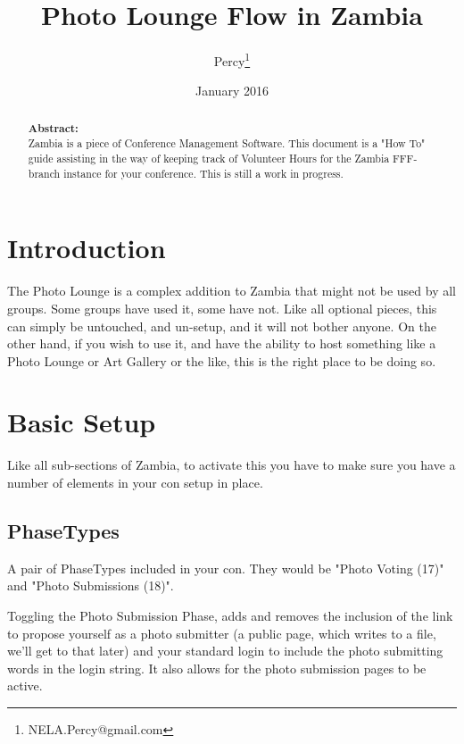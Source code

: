 \documentclass[captions=tablesignature]{scrartcl}
\author{Percy\thanks{NELA.Percy@gmail.com}}
\date{January 2016}
\title{Photo Lounge Flow in Zambia}
\begin{document}
\maketitle
{}
\thispagestyle{fancy}
\renewcommand{\headrulewidth}{0pt}
\renewcommand{\footrulewidth}{0pt}
\lhead{}
\rhead{}
\chead{}
\lfoot{}
\cfoot{}
\rfoot{}
\begin{abstract}
\vspace{5cm}
{\LARGE{\textbf{Abstract:\\}}}
Zambia is a piece of Conference Management Software.  This document is a "How To" guide assisting in the way of keeping track of Volunteer Hours for the Zambia FFF-branch instance for your conference.  This is still a work in progress.
\end{abstract}
\newpage
\renewcommand{\headrulewidth}{1pt}
\renewcommand{\footrulewidth}{1pt}
\rfoot{\thepage}
\setcounter{tocdepth}{3}
\tableofcontents
\newpage
{}
\section{Introduction}
\label{sec-1}

The Photo Lounge is a complex addition to Zambia that might not be
used by all groups.  Some groups have used it, some have not.  Like
all optional pieces, this can simply be untouched, and un-setup, and
it will not bother anyone.  On the other hand, if you wish to use
it, and have the ability to host something like a Photo Lounge or
Art Gallery or the like, this is the right place to be doing so.
\section{Basic Setup}
\label{sec-2}

Like all sub-sections of Zambia, to activate this you have to make
sure you have a number of elements in your con setup in place.
\subsection{PhaseTypes}
\label{sec-2-1}

A pair of PhaseTypes included in your con.  They would be "Photo
Voting (17)" and "Photo Submissions (18)".

Toggling the Photo Submission Phase, adds and removes the inclusion
of the link to propose yourself as a photo submitter (a public
page, which writes to a file, we'll get to that later) and your
standard login to include the photo submitting words in the login
string.  It also allows for the photo submission pages to be
active.
\end{document}
